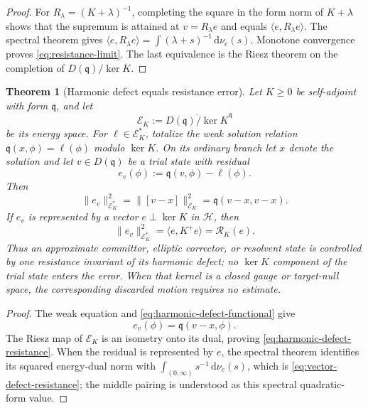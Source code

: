 \documentclass[11pt]{article}
\numberwithin{section}{part}
\theoremstyle{plain}
\newtheorem{theorem}{Theorem}[section]
\theoremstyle{definition}
\theoremstyle{remark}
\newcommand{\dd}{\,\mathrm d}
\newcommand{\Hspace}{\mathcal H}
\begin{document}
\begin{proof}
For \(R_\lambda=(K+\lambda)^{-1}\), completing the square in the form norm
of \(K+\lambda\) shows that the supremum is attained at
\(v=R_\lambda e\) and equals \(\langle e,R_\lambda e\rangle\).
The spectral theorem gives
\(\langle e,R_\lambda e\rangle
=\int(\lambda+s)^{-1}\dd\nu_e(s)\).  Monotone convergence proves
\eqref{eq:resistance-limit}.  The last equivalence is the Riesz theorem on the
completion of \(D(\mathfrak q)/\ker K\).
\end{proof}

\begin{theorem}[Harmonic defect equals resistance error]
\label{thm:harmonic-defect-resistance}
Let \(K\ge0\) be self-adjoint with form \(\mathfrak q\), and let
\[
 \mathcal E_K:=\overline{D(\mathfrak q)/\ker K}^{\mathfrak q}
\]
be its energy space.  For \(\ell\in\mathcal E_K^*\), totalize the weak
solution relation \(\mathfrak q(x,\phi)=\ell(\phi)\) modulo \(\ker K\).  On
its ordinary branch let \(x\) denote the solution and let
\(v\in D(\mathfrak q)\) be a trial state with residual
\begin{equation}
 \label{eq:harmonic-defect-functional}
 e_v(\phi):=\mathfrak q(v,\phi)-\ell(\phi).
\end{equation}
Then
\begin{equation}
 \label{eq:harmonic-defect-resistance}
 \|e_v\|_{\mathcal E_K^*}^2
 =\|[v-x]\|_{\mathcal E_K}^2
 =\mathfrak q(v-x,v-x).
\end{equation}
If \(e_v\) is represented by a vector \(e\perp\ker K\) in \(\Hspace\), then
\begin{equation}
 \label{eq:vector-defect-resistance}
 \|e_v\|_{\mathcal E_K^*}^2
 =\langle e,K^+e\rangle
 =\mathcal R_K(e).
\end{equation}
Thus an approximate committor, elliptic corrector, or resolvent state is
controlled by one resistance invariant of its harmonic defect; no
\(\ker K\) component of the trial state enters the error.  When that kernel
is a closed gauge or target-null space, the corresponding discarded
motion requires no estimate.
\end{theorem}

\begin{proof}
The weak equation and \eqref{eq:harmonic-defect-functional} give
\[
 e_v(\phi)=\mathfrak q(v-x,\phi).
\]
The Riesz map of \(\mathcal E_K\) is an isometry onto its dual, proving
\eqref{eq:harmonic-defect-resistance}.  When the residual is represented by
\(e\), the spectral theorem identifies its squared energy-dual norm with
\(\int_{(0,\infty)}s^{-1}\dd\nu_e(s)\), which is
\eqref{eq:vector-defect-resistance}; the middle pairing is understood as
this spectral quadratic-form value.
\end{proof}
\end{document}
